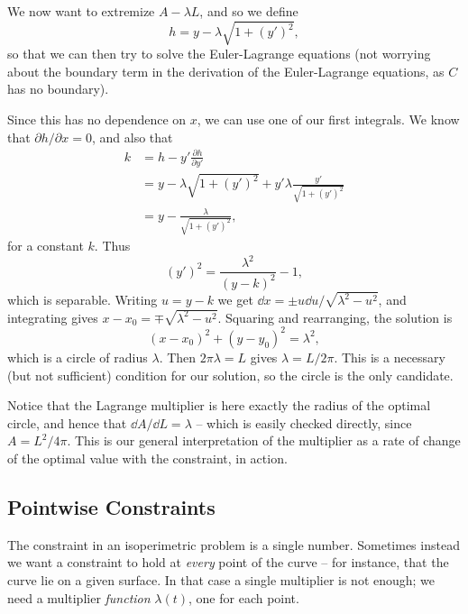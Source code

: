 \documentclass[a4paper]{scrartcl}
\begin{document}
\begin{example}
	We now want to extremize $A - \lambda L$, and so we define
	$$
	h = y - \lambda \sqrt{1 + (y')^2},
	$$
	so that we can then try to solve the Euler-Lagrange equations (not worrying about the boundary term in the derivation of the Euler-Lagrange equations, as $C$ has no boundary).

	Since this has no dependence on $x$, we can use one of our first integrals. We know that $\partial h/\partial x = 0$, and also that
	\begin{align*}
		k &= h - y' \frac{\partial h}{\partial y'} \\
		  &= y - \lambda \sqrt{1 + (y')^2} + y' \lambda \frac{y'}{\sqrt{1 + (y')^2}}\\
		  &= y - \frac{\lambda}{\sqrt{1 + (y')^2}},
	\end{align*}
	for a constant $k$. Thus
	$$
	(y')^2 = \frac{\lambda^2}{(y - k)^2} - 1,
	$$
	which is separable. Writing $u = y - k$ we get $\dd x = \pm u\dd u/\sqrt{\lambda^2 - u^2}$, and integrating gives $x - x_0 = \mp\sqrt{\lambda^2 - u^2}$. Squaring and rearranging, the solution is
	$$
	(x - x_0)^2 + (y - y_0)^2 = \lambda^2,
	$$
	which is a circle of radius $\lambda$. Then $2\pi \lambda = L$ gives $\lambda = L/2\pi$. This is a necessary (but not sufficient) condition for our solution, so the circle is the only candidate.

	Notice that the Lagrange multiplier is here exactly the radius of the optimal circle, and hence that $\dd A/\dd L = \lambda$ -- which is easily checked directly, since $A = L^2/4\pi$. This is our general interpretation of the multiplier as a rate of change of the optimal value with the constraint, in action.
\end{example}

\subsection{Pointwise Constraints}

The constraint in an isoperimetric problem is a single number. Sometimes instead we want a constraint to hold at \emph{every} point of the curve -- for instance, that the curve lie on a given surface. In that case a single multiplier is not enough; we need a multiplier \emph{function} $\lambda(t)$, one for each point.
\end{document}
